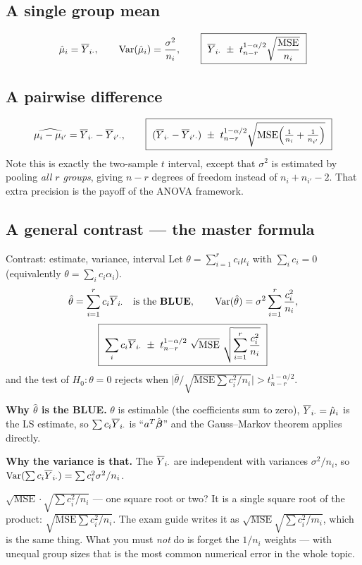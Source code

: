 \documentclass[11pt]{article}
\begin{document}
\subsection{A single group mean}
\[
  \hat\mu_i=\Ybar_{i\cdot},\qquad \Var(\hat\mu_i)=\frac{\sigma^2}{n_i},
  \qquad
  \boxed{\ \Ybar_{i\cdot}\ \pm\ t^{1-\alpha/2}_{n-r}\sqrt{\frac{\mathrm{MSE}}{n_i}}\ }
\]

\subsection{A pairwise difference}
\[
  \widehat{\mu_i-\mu_{i'}}=\overline{Y}_{i\cdot}-\overline{Y}_{i'\cdot},
  \qquad
  \boxed{\ (\overline{Y}_{i\cdot}-\overline{Y}_{i'\cdot})\ \pm\ t^{1-\alpha/2}_{n-r}
  \sqrt{\mathrm{MSE}\Big(\tfrac1{n_i}+\tfrac1{n_{i'}}\Big)}\ }
\]
Note this is exactly the two-sample $t$ interval, except that $\sigma^2$ is estimated by
pooling \emph{all $r$ groups}, giving $n-r$ degrees of freedom instead of $n_i+n_{i'}-2$.
That extra precision is the payoff of the ANOVA framework.

\subsection{A general contrast --- the master formula}

\begin{recipe}{Contrast: estimate, variance, interval}
Let $\theta=\sum_{i=1}^r c_i\mu_i$ with $\sum_i c_i=0$ (equivalently $\theta=\sum_i c_i\alpha_i$).
\[
  \hat\theta=\sum_{i=1}^r c_i\overline{Y}_{i\cdot} \quad\text{is the \textbf{BLUE}},
  \qquad
  \operatorname{Var}(\hat\theta)=\sigma^2\sum_{i=1}^r\frac{c_i^2}{n_i},
\]
\[
  \boxed{\ \sum_i c_i\Ybar_{i\cdot}\ \pm\ t^{1-\alpha/2}_{n-r}\ \sqrt{\mathrm{MSE}}\ \sqrt{\sum_{i=1}^r\frac{c_i^2}{n_i}}\ }
\]
and the test of $H_0:\theta=0$ rejects when $\big|\hat\theta\big/\sqrt{\mathrm{MSE}\sum c_i^2/n_i}\big|>t^{1-\alpha/2}_{n-r}$.
\end{recipe}

\textbf{Why $\hat\theta$ is the BLUE.} $\theta$ is estimable (the coefficients sum to zero),
$\overline{Y}_{i\cdot}=\hat\mu_i$ is the LS estimate, so $\sum c_i\overline{Y}_{i\cdot}$ is
``$a^T\hat{\boldsymbol{\beta}}$'' and the Gauss--Markov theorem applies directly.

\textbf{Why the variance is that.} The $\overline{Y}_{i\cdot}$ are independent with variances
$\sigma^2/n_i$, so $\operatorname{Var}(\sum c_i\overline{Y}_{i\cdot})=\sum c_i^2\sigma^2/n_i$.

\begin{confusion}{$\sqrt{\mathrm{MSE}}\cdot\sqrt{\sum c_i^2/n_i}$ --- one square root or two?}
It is a single square root of the product: $\sqrt{\mathrm{MSE}\sum c_i^2/n_i}$. The exam guide
writes it as $\sqrt{\mathrm{MSE}}\sqrt{\sum c_i^2/m_i}$, which is the same thing. What you must
\emph{not} do is forget the $1/n_i$ weights --- with unequal group sizes that is the most
common numerical error in the whole topic.
\end{confusion}
\end{document}
